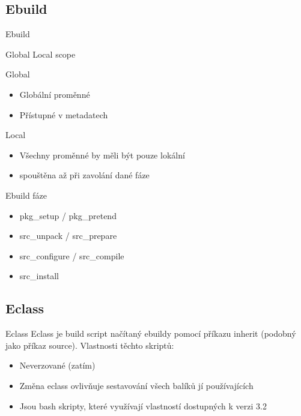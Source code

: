 \documentclass{beamer}
\begin{document}
\subsection{Ebuild}
\begin{frame}{Ebuild}

\end{frame}
\begin{frame}{Global Local scope}
	\begin{center}Global\end{center}
	\begin{itemize}
		\item Globální proměnné
		\item Přístupné v metadatech
	\end{itemize}
	\begin{center}Local\end{center}
	\begin{itemize}
		\item Všechny proměnné by měli být pouze lokální
		\item spouštěna až při zavolání dané fáze
	\end{itemize}
\end{frame}
\begin{frame}{Ebuild fáze}
	\begin{itemize}
		\item pkg\_setup / pkg\_pretend
		\item src\_unpack / src\_prepare
		\item src\_configure / src\_compile
		\item src\_install
	\end{itemize}
\end{frame}

\subsection{Eclass}
\begin{frame}{Eclass}
Eclass je build script načítaný ebuildy pomocí příkazu inherit (podobný jako
příkaz source).
Vlastnosti těchto skriptů:
\begin{itemize}
	\item Neverzované (zatím)
	\item Změna eclass ovlivňuje sestavování všech balíků jí používajících
	\item Jsou bash skripty, které využívají vlastností dostupných k verzi 3.2
\end{itemize}
\end{frame}
\end{document}
